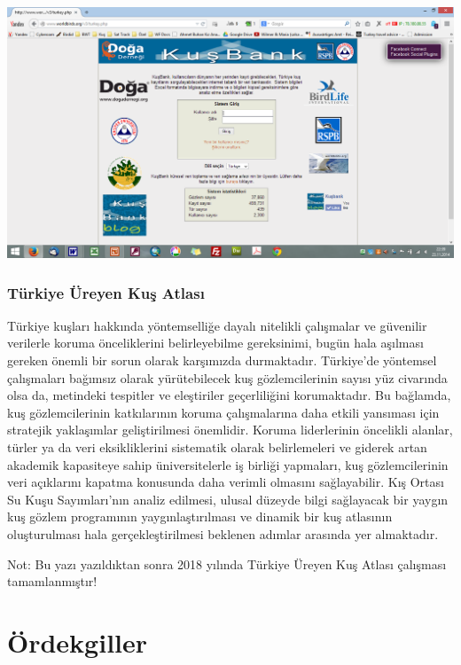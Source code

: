 \documentclass[
  a4paper,
  DIV=11,
  numbers=noendperiod]{scrreprt}
\begin{document}
\includegraphics{images/kusbank.png}

\subsection*{Türkiye Üreyen Kuş
Atlası}\label{tuxfcrkiye-uxfcreyen-kuux15f-atlasux131}

Türkiye kuşları hakkında yöntemselliğe dayalı nitelikli çalışmalar ve
güvenilir verilerle koruma önceliklerini belirleyebilme gereksinimi,
bugün hala aşılması gereken önemli bir sorun olarak karşımızda
durmaktadır. Türkiye'de yöntemsel çalışmaları bağımsız olarak
yürütebilecek kuş gözlemcilerinin sayısı yüz civarında olsa da,
metindeki tespitler ve eleştiriler geçerliliğini korumaktadır. Bu
bağlamda, kuş gözlemcilerinin katkılarının koruma çalışmalarına daha
etkili yansıması için stratejik yaklaşımlar geliştirilmesi önemlidir.
Koruma liderlerinin öncelikli alanlar, türler ya da veri eksikliklerini
sistematik olarak belirlemeleri ve giderek artan akademik kapasiteye
sahip üniversitelerle iş birliği yapmaları, kuş gözlemcilerinin veri
açıklarını kapatma konusunda daha verimli olmasını sağlayabilir. Kış
Ortası Su Kuşu Sayımları'nın analiz edilmesi, ulusal düzeyde bilgi
sağlayacak bir yaygın kuş gözlem programının yaygınlaştırılması ve
dinamik bir kuş atlasının oluşturulması hala gerçekleştirilmesi beklenen
adımlar arasında yer almaktadır.

Not: Bu yazı yazıldıktan sonra 2018 yılında Türkiye Üreyen Kuş Atlası
çalışması tamamlanmıştır!


\chapter{Ördekgiller}\label{uxf6rdekgiller}
\end{document}
